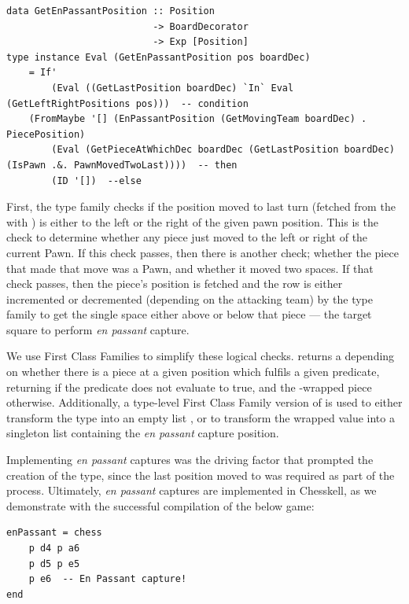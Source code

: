 \begin{lstlisting}
data GetEnPassantPosition :: Position
                          -> BoardDecorator
                          -> Exp [Position]
type instance Eval (GetEnPassantPosition pos boardDec)
    = If'
        (Eval ((GetLastPosition boardDec) `In` Eval (GetLeftRightPositions pos)))  -- condition
    (FromMaybe '[] (EnPassantPosition (GetMovingTeam boardDec) . PiecePosition)
        (Eval (GetPieceAtWhichDec boardDec (GetLastPosition boardDec) (IsPawn .&. PawnMovedTwoLast))))  -- then
        (ID '[])  --else
\end{lstlisting}

First, the type family checks if the position moved to last turn (fetched from the  with ) is either to the left or the right of the given pawn position. This is the check to determine whether any piece just moved to the left or right of the current Pawn. If this check passes, then there is another check; whether the piece that made that move was a Pawn, and whether it moved two spaces. If that check passes, then the piece's position is fetched and the row is either incremented or decremented (depending on the attacking team) by the type family  to get the single space either above or below that piece --- the target square to perform \emph{en passant} capture.

We use First Class Families to simplify these logical checks.  returns a  depending on whether there is a piece at a given position which fulfils a given predicate, returning  if the predicate does not evaluate to true, and the -wrapped piece otherwise. Additionally, a type-level First Class Family version of  is used to either transform the  type into an empty list , or to transform the wrapped value into a singleton list containing the \emph{en passant} capture position.

Implementing \emph{en passant} captures was the driving factor that prompted the creation of the  type, since the last position moved to was required as part of the process. Ultimately, \emph{en passant} captures are implemented in Chesskell, as we demonstrate with the successful compilation of the below game:

\begin{lstlisting}
enPassant = chess
    p d4 p a6
    p d5 p e5
    p e6  -- En Passant capture!
end
\end{lstlisting}

